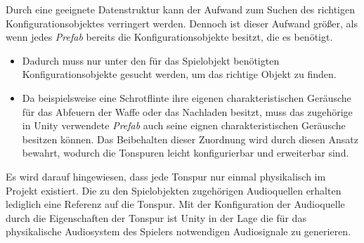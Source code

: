{Durch eine geeignete Datenstruktur kann der Aufwand zum Suchen des richtigen Konfigurationsobjektes verringert werden. Dennoch ist dieser Aufwand größer, als wenn jedes \textit{Prefab} bereits die Konfigurationsobjekte besitzt, die es benötigt. 

\begin{itemize}
	\item Dadurch muss nur unter den für das Spielobjekt benötigten Konfigurationsobjekte gesucht werden, um das richtige Objekt zu finden. 
	\item Da beispielsweise eine Schrotflinte ihre eigenen charakteristischen Geräusche für das Abfeuern der Waffe oder das Nachladen besitzt, muss das zugehörige in Unity verwendete \textit{Prefab} auch seine eignen charakteristischen Geräusche besitzen können. Das Beibehalten dieser Zuordnung wird durch diesen Ansatz bewahrt, wodurch die Tonspuren leicht konfigurierbar und erweiterbar sind.
\end{itemize} 

Es wird darauf hingewiesen, dass jede Tonspur nur einmal physikalisch im Projekt existiert. Die zu den Spielobjekten  zugehörigen Audioquellen erhalten lediglich eine Referenz auf die Tonspur. Mit der Konfiguration der Audioquelle durch die Eigenschaften der Tonspur ist Unity in der Lage die für das physikalische Audiosystem des Spielers notwendigen Audiosignale zu generieren. %


}
